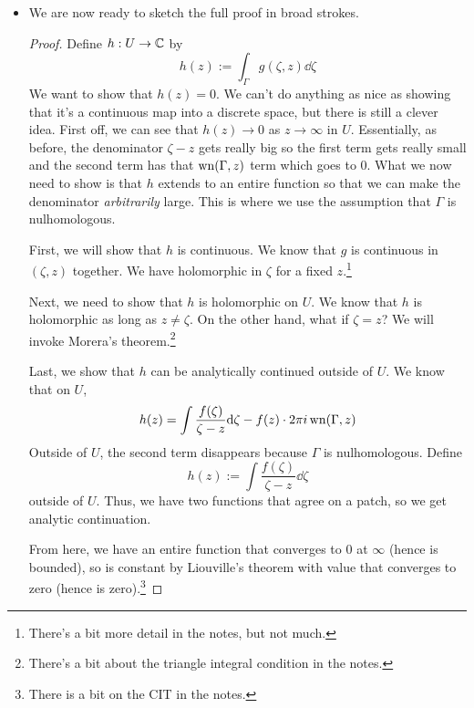 \documentclass[../notes.tex]{subfiles}
\begin{document}
\begin{itemize}
\begin{itemize}
\begin{itemize}
        \end{itemize}
        \item In sum, the idea of this proof is to prove the CIF and then simply get the CIT.
        \item We'll have time to prove the CIF today, but probably will not to get to the CIT.
    \end{itemize}
    \item We are now ready to sketch the full proof in broad strokes.
    \begin{proof}
        Define $h:U\to\mathbb{C}$ by
        \begin{equation*}
            h(z) := \int_\Gamma g(\zeta,z)\dd\zeta
        \end{equation*}
        We want to show that $h(z)=0$. We can't do anything as nice as showing that it's a continuous map into a discrete space, but there is still a clever idea. First off, we can see that $h(z)\to 0$ as $z\to\infty$ in $U$. Essentially, as before, the denominator $\zeta-z$ gets really big so the first term gets really small and the second term has that $\operatorname{wn}(\Gamma,z)$ term which goes to 0. What we now need to show is that $h$ extends to an entire function so that we can make the denominator \emph{arbitrarily} large. This is where we use the assumption that $\Gamma$ is nulhomologous.\par
        First, we will show that $h$ is continuous. We know that $g$ is continuous in $(\zeta,z)$ together. We have holomorphic in $\zeta$ for a fixed $z$.\footnote{There's a bit more detail in the notes, but not much.}\par
        Next, we need to show that $h$ is holomorphic on $U$. We know that $h$ is holomorphic as long as $z\neq\zeta$. On the other hand, what if $\zeta=z$? We will invoke Morera's theorem.\footnote{There's a bit about the triangle integral condition in the notes.}\par
        Last, we show that $h$ can be analytically continued outside of $U$. We know that on $U$,
        \begin{equation*}
            h(z) = \int\frac{f(\zeta)}{\zeta-z}\dd\zeta-f(z)\cdot 2\pi i\operatorname{wn}(\Gamma,z)
        \end{equation*}
        Outside of $U$, the second term disappears because $\Gamma$ is nulhomologous. Define
        \begin{equation*}
            h(z) := \int\frac{f(\zeta)}{\zeta-z}\dd\zeta
        \end{equation*}
        outside of $U$. Thus, we have two functions that agree on a patch, so we get analytic continuation.\par
        From here, we have an entire function that converges to $0$ at $\infty$ (hence is bounded), so is constant by Liouville's theorem with value that converges to zero (hence is zero).\footnote{There is a bit on the CIT in the notes.}
    \end{proof}
\end{itemize}
\end{document}
